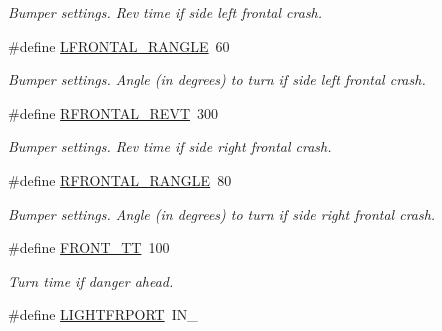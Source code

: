 \begin{DoxyCompactItemize}
\begin{DoxyCompactList}\small\item\em Bumper settings. Rev time if side left frontal crash. \item\end{DoxyCompactList}\item 
\hypertarget{fence_8nxc_ad19631fb45582ad9441719c376c07c3b}{
\#define \hyperlink{fence_8nxc_ad19631fb45582ad9441719c376c07c3b}{LFRONTAL\_\-RANGLE}~60}
\label{fence_8nxc_ad19631fb45582ad9441719c376c07c3b}

\begin{DoxyCompactList}\small\item\em Bumper settings. Angle (in degrees) to turn if side left frontal crash. \item\end{DoxyCompactList}\item 
\hypertarget{fence_8nxc_a623033e48068d57555d513a2d56d0c40}{
\#define \hyperlink{fence_8nxc_a623033e48068d57555d513a2d56d0c40}{RFRONTAL\_\-REVT}~300}
\label{fence_8nxc_a623033e48068d57555d513a2d56d0c40}

\begin{DoxyCompactList}\small\item\em Bumper settings. Rev time if side right frontal crash. \item\end{DoxyCompactList}\item 
\hypertarget{fence_8nxc_a70438bca69ec65d9a29a9f120922464d}{
\#define \hyperlink{fence_8nxc_a70438bca69ec65d9a29a9f120922464d}{RFRONTAL\_\-RANGLE}~80}
\label{fence_8nxc_a70438bca69ec65d9a29a9f120922464d}

\begin{DoxyCompactList}\small\item\em Bumper settings. Angle (in degrees) to turn if side right frontal crash. \item\end{DoxyCompactList}\item 
\hypertarget{fence_8nxc_a7861c2174f24a87c43840f87f3cf8a14}{
\#define \hyperlink{fence_8nxc_a7861c2174f24a87c43840f87f3cf8a14}{FRONT\_\-TT}~100}
\label{fence_8nxc_a7861c2174f24a87c43840f87f3cf8a14}

\begin{DoxyCompactList}\small\item\em Turn time if danger ahead. \item\end{DoxyCompactList}\item 
\hypertarget{fence_8nxc_ab9d3d1049b45438591608c99774c5cba}{
\#define \hyperlink{fence_8nxc_ab9d3d1049b45438591608c99774c5cba}{LIGHTFRPORT}~IN\_}
\label{fence_8nxc_ab9d3d1049b45438591608c99774c5cba}


\end{DoxyCompactItemize}
